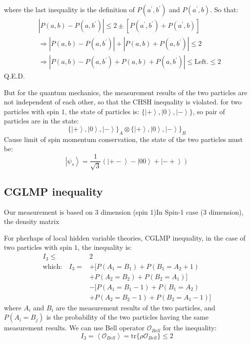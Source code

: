 \documentclass{article}
\newcommand{\ket}[1]{\left|#1\right\rangle}
\newcommand{\braket}[1]{\left\langle#1\right\rangle}
\begin{document}
where the last inequality is the definition of \(P(a^\prime,b^\prime)\) and \(P(a^\prime,b)\). So that:
\begin{align*}
    &|P(a,b)-P(a,b^\prime)|\leqslant 2 \pm \left[P(a^\prime,b^\prime)+P(a^\prime,b)\right]\\
    &\Rightarrow |P(a,b)-P(a,b^\prime)|+|P(a,b)+P(a,b^\prime)|\leqslant 2\\
    &\Rightarrow |P(a,b)-P(a,b^\prime)+P(a,b)+P(a,b^\prime)|\leqslant \text{Left.} \leqslant 2
\end{align*}
Q.E.D. 

But for the quantum mechanics, the measurement results of the two particles are not independent of each other, so that the CHSH inequality is violated. for two particles with spin \(1\), the state of particles is: \(\{\ket{+},\ket{0},\ket{-}\}\), so pair of particles are in the state:
\[\{\ket{+},\ket{0},\ket{-}\}_A\otimes\{\ket{+},\ket{0},\ket{-}\}_B\]
Cause limit of spin momentum conservation, the state of the two particles must be:
\[\ket{\psi_{s}}=\frac{1}{\sqrt{3}}(\ket{+-}-\ket{00}+\ket{-+})\]


\subsection{CGLMP inequality}
Our measurement is based on 3 dimension (spin 1)In Spin-1 case (3 dimension), the density matrix

For pherhaps of local hidden variable theories, CGLMP inequality\cite{dalton2021cglmp}, in the case of two particles with spin \(1\), the inequality\cite{Collins_2002} is:
\begin{align*}
    I_3\leq &2 \\
    \textrm{which:}\quad I_3 = &+[P(A_1=B_1)+P(B_1=A_2+1)\\
          &+P(A_2=B_2)+P(B_2=A_1)]\\
          &-[P(A_1=B_1-1)+P(B_1=A_2)\\
          &+P(A_2=B_2-1)+P(B_2=A_1-1)]
\end{align*}
where \(A_i\) and \(B_i\) are the measurement results of the two particles, and \(P(A_i=B_j)\) is the probability of the two particles having the same measurement results. We can use Bell operator \(\mathcal{O}_{Bell}\) for the inequality:
\[I_3=\braket{\mathcal{O}_{Bell}}=\mathrm{tr}\{\rho \mathcal{O}_{Bell} \}\leqslant 2\]
\end{document}
